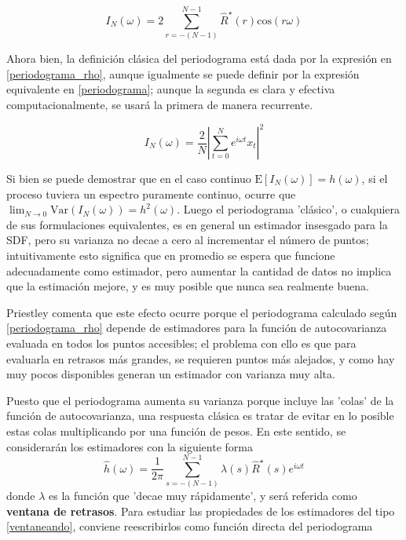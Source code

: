 \documentclass[12pt,a4paper]{mitthesis}
\newcommand{\aste}[1]{\widehat{ #1 }^{\star}}
\newcommand{\est}[1]{\widehat{ #1 }}
\newcommand{\COS}[1]{\mathrm{cos}\left( #1 \right)}
\newcommand{\E}[1]{\mathrm{E}\left[ #1 \right]}
\newcommand{\Var}[1]{\mathrm{Var}\left( #1 \right)}
\newcommand{\abso}[1]{\left| #1 \right|}
\begin{document}
\begin{equation}
I_N(\omega) = 2 \sum_{r = -(N-1)}^{N-1} \aste{R}(r) \COS{r \omega}
\label{periodograma_rho}
\end{equation}

Ahora bien, la definici\'on cl\'asica del periodograma est\'a dada por la expresi\'on en 
\ref{periodograma_rho}, aunque igualmente se puede definir por la expresi\'on equivalente en 
\ref{periodograma}; aunque la segunda es clara y efectiva computacionalmente, se usar\'a la primera 
de manera recurrente.

\begin{equation}
I_N(\omega) = \frac{2}{N} \abso{ \sum_{t=0}^{N} e^{i \omega t} x_t }^{2}
\label{periodograma}
\end{equation}

Si bien se puede demostrar que en el caso continuo $\E{I_N(\omega)}=h(\omega)$, si el proceso 
tuviera un espectro puramente continuo, ocurre que 
$\lim_{N\rightarrow 0} \Var{I_N(\omega)} = h^{2}(\omega)$. Luego el periodograma 'cl\'asico', o 
cualquiera de sus formulaciones equivalentes, es en general un estimador insesgado para la SDF, 
pero su varianza no decae a cero al incrementar el n\'umero de puntos; intuitivamente esto significa 
que en promedio se espera que funcione adecuadamente como estimador, pero aumentar la cantidad de 
datos no implica que la estimaci\'on mejore, y es muy posible que nunca sea realmente buena.

Priestley comenta que este efecto ocurre porque el periodograma calculado seg\'un 
\ref{periodograma_rho} depende de estimadores para la funci\'on de autocovarianza 
evaluada en todos los puntos accesibles; el problema con ello es que para evaluarla en retrasos 
m\'as grandes, se requieren puntos m\'as alejados, y como hay muy pocos disponibles generan un 
estimador con varianza muy alta.

Puesto que el periodograma aumenta su varianza porque incluye las 'colas' de la funci\'on de
autocovarianza, una respuesta cl\'asica es tratar de evitar en lo posible estas colas multiplicando 
por una funci\'on de pesos. En este sentido, se considerar\'an los estimadores con la siguiente 
forma
\begin{equation}
\est{h}(\omega) = \frac{1}{2\pi} \sum_{s = -(N-1)}^{N-1} 
\lambda(s) \aste{R}(s) e^{i \omega t}
\label{ventaneando}
\end{equation}
donde $\lambda$ es la funci\'on que 'decae muy r\'apidamente', y ser\'a referida como 
\textbf{ventana de retrasos}. Para estudiar las propiedades de los estimadores del tipo 
\ref{ventaneando}, conviene reescribirlos como funci\'on directa del periodograma
\end{document}
